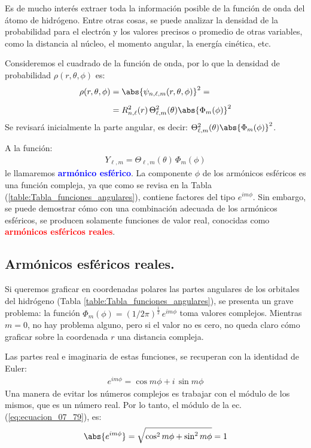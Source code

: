Es de mucho interés extraer toda la información posible de la función de onda del átomo de hidrógeno. Entre otras cosas, se puede analizar la densidad de la probabilidad para el electrón y los valores precisos o promedio de otras variables, como la distancia al núcleo, el momento angular, la energía cinética, etc.
\par
Consideremos el cuadrado de la función de onda, por lo que la densidad de probabilidad $\rho (r, \theta, \phi)$ es:
\begin{align}
\begin{aligned}[b]
\rho (r, \theta, \phi) &= \abs{\psi_{n, \ell, m} (r, \theta, \phi)}^{2} = \\[0.5em]
&= R_{n,\ell}^{2} (r) \, \Theta_{\ell,m}^{2} (\theta) \abs{\Phi_{m} (\phi)}^{2}
\end{aligned}
\label{eq:ecuacion_07_42}
\end{align}
Se revisará inicialmente la parte angular, es decir: $\Theta_{\ell,m}^{2} (\theta) \abs{\Phi_{m} (\phi)}^{2}$.
\par
A la función:
\begin{align}
Y_{\ell, m} = \Theta_{\ell,m} (\theta) \,\Phi_{m} (\phi)
\label{eq:ecuacion_07_76}
\end{align}
le llamaremos \textbf{\textcolor{blue}{armónico esférico}}. La componente $\phi$ de los armónicos esféricos es una función compleja, ya que como se revisa en la Tabla (\ref{table:Tabla_funciones_angulares}), contiene factores del tipo $e^{i m \phi}$. Sin embargo, se puede demostrar cómo con una combinación adecuada de los armónicos esféricos, se producen solamente funciones de valor real, conocidas como \textbf{\textcolor{red}{armónicos esféricos reales}}.

\subsection{Armónicos esféricos reales.}

Si queremos graficar en coordenadas polares las partes angulares de los orbitales del hidrógeno (Tabla \ref{table:Tabla_funciones_angulares}), se presenta un grave problema: la función $\Phi_{m} (\phi) = (1/2 \pi)^{\frac{1}{2}} \, e^{i m \phi}$ toma valores complejos. Mientras $m = 0$, no hay problema alguno, pero si el valor no es cero, no queda claro cómo graficar sobre la coordenada $r$ una distancia compleja.
\par
Las partes real e imaginaria de estas funciones, se recuperan con la identidad de Euler:
\begin{align}
e^{i m \phi} = \cos m \phi + i \, \sin m \phi
\label{eq:ecuacion_07_79}
\end{align}
Una manera de evitar los números complejos es trabajar con el módulo de los mismos, que es un número real. Por lo tanto, el módulo de la ec. (\ref{eq:ecuacion_07_79}), es:
\begin{align}
\abs{e^{i m \phi}} = \sqrt{ \cos^{2} m \phi + \sin^{2} m \phi} = 1
\label{eq:ecuacion_07_80}
\end{align}


